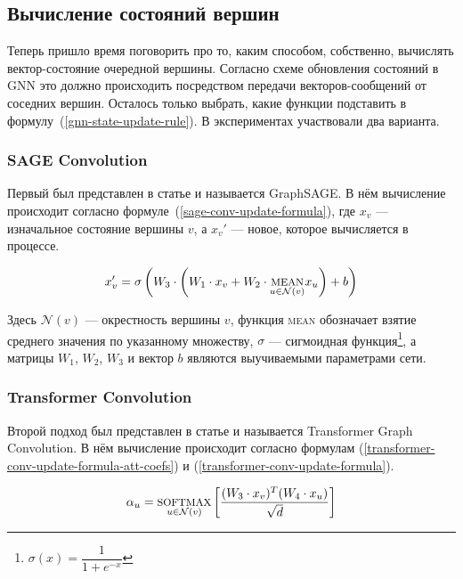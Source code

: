 \subsection{Вычисление состояний вершин}

Теперь пришло время поговорить про то, каким способом, собственно, вычислять вектор-состояние очередной вершины. Согласно схеме обновления состояний в GNN это должно происходить посредством передачи векторов-сообщений от соседних вершин. Осталось только выбрать, какие функции подставить в формулу~(\ref{gnn-state-update-rule}). В экспериментах участвовали два варианта.

\subsubsection{SAGE Convolution} \label{sage-conv-desc}

Первый был представлен в статье \cite{sage-conv-paper} и называется GraphSAGE. В нём вычисление происходит согласно формуле~(\ref{sage-conv-update-formula}), где $x_v$ --- изначальное состояние вершины $v$, а $x_v'$ --- новое, которое вычисляется в процессе.

\begin{equation} \label{sage-conv-update-formula}
    x_v' = \sigma \left(W_3 \cdot \left(W_1 \cdot x_v + W_2 \cdot \underset{u \in \mathcal{N}(v)}{\text{\textsc{mean}}} x_u \right) + b \right)
\end{equation}

Здесь $\mathcal{N}(v)$ --- окрестность вершины $v$, функция \textsc{mean} обозначает взятие среднего значения по указанному множеству, $\sigma$ --- сигмоидная функция\footnote{$\sigma(x) = \dfrac{1}{1 + e^{-x}}$}, а матрицы $W_1$, $W_2$, $W_3$ и вектор $b$ являются выучиваемыми параметрами сети.

\subsubsection{Transformer Convolution} \label{transformer-conv-desc}

Второй подход был представлен в статье \cite{transformer-conv-paper} и называется Transformer Graph Convolution. В нём вычисление происходит согласно формулам (\ref{transformer-conv-update-formula-att-coefs}) и (\ref{transformer-conv-update-formula}).

\begin{equation} \label{transformer-conv-update-formula-att-coefs}
    \alpha_{u} = \underset{u \in \mathcal{N}(v)}{\text{\textsc{softmax}}} \left[\frac{(W_3 \cdot x_v)^T (W_4 \cdot x_u)}{\sqrt d} \right]
\end{equation}

